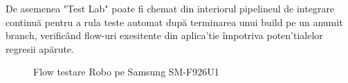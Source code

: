 De asemenea "Test Lab" poate fi chemat din interiorul pipelineul de integrare continuă pentru a rula teste automat după terminarea unui build pe un anumit branch, verificând flow-uri exesitente din aplica'tie împotriva poten'tialelor regresii apărute.

\begin{figure}[h!]
  \centering
  \caption{Flow testare Robo pe Samsung SM-F926U1}
\end{figure}